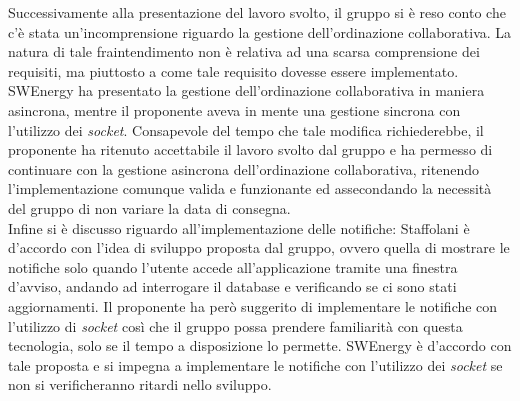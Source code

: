 Successivamente alla presentazione del lavoro svolto, il gruppo si è reso conto 
che c'è stata un'incomprensione riguardo la gestione dell'ordinazione 
collaborativa.
La natura di tale fraintendimento non è relativa ad una scarsa comprensione dei 
requisiti, ma piuttosto a come tale requisito dovesse essere implementato.
SWEnergy ha presentato la gestione dell'ordinazione collaborativa in maniera 
asincrona, mentre il proponente aveva in mente una gestione sincrona con 
l'utilizzo dei \textit{socket}.
Consapevole del tempo che tale modifica richiederebbe, il proponente ha ritenuto 
accettabile il lavoro svolto dal gruppo e ha permesso di continuare con la 
gestione asincrona dell'ordinazione collaborativa, ritenendo l'implementazione 
comunque valida e funzionante ed assecondando la necessità del gruppo di non 
variare la data di consegna. \\
Infine si è discusso riguardo all'implementazione delle notifiche: Staffolani è 
d'accordo con l'idea di sviluppo proposta dal gruppo, ovvero quella di mostrare 
le notifiche solo quando l'utente accede all'applicazione tramite una finestra 
d'avviso, andando ad interrogare il database e verificando se ci sono stati 
aggiornamenti. Il proponente ha però suggerito di implementare le notifiche con 
l'utilizzo di \textit{socket} così che il gruppo possa prendere familiarità con 
questa tecnologia, solo se il tempo a disposizione lo permette. SWEnergy è 
d'accordo con tale proposta e si impegna a implementare le notifiche con 
l'utilizzo dei \textit{socket} se non si verificheranno ritardi nello sviluppo.
